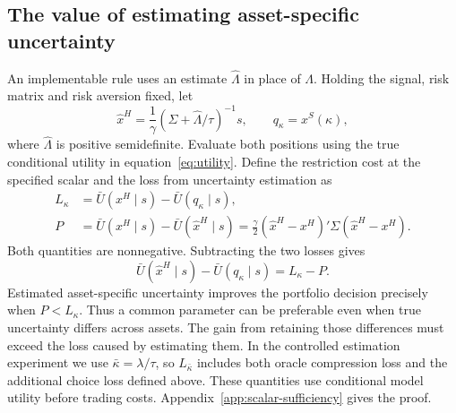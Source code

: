 \subsection{The value of estimating asset-specific uncertainty}
An implementable rule uses an estimate $\widehat\Lambda$ in place of $\Lambda$. Holding the signal, risk matrix and risk aversion fixed, let
\begin{equation}
\widehat x^H=\frac{1}{\gamma}(\Sigma+\widehat\Lambda/\tau)^{-1}s,
\qquad q_\kappa=x^S(\kappa),
\end{equation}
where $\widehat\Lambda$ is positive semidefinite. Evaluate both positions using the true conditional utility in equation~\eqref{eq:utility}. Define the restriction cost at the specified scalar and the loss from uncertainty estimation as
\begin{align}
L_\kappa&=\bar U(x^H\mid s)-\bar U(q_\kappa\mid s),\\
P&=\bar U(x^H\mid s)-\bar U(\widehat x^H\mid s)
=\frac{\gamma}{2}(\widehat x^H-x^H)'\Sigma(\widehat x^H-x^H).
\label{eq:estimation-penalty}
\end{align}
Both quantities are nonnegative. Subtracting the two losses gives
\begin{equation}
\bar U(\widehat x^H\mid s)-\bar U(q_\kappa\mid s)=L_\kappa-P.
\label{eq:estimation-tradeoff}
\end{equation}
Estimated asset-specific uncertainty improves the portfolio decision precisely when $P<L_\kappa$. Thus a common parameter can be preferable even when true uncertainty differs across assets. The gain from retaining those differences must exceed the loss caused by estimating them. In the controlled estimation experiment we use $\bar\kappa=\lambda/\tau$, so $L_{\bar\kappa}$ includes both oracle compression loss and the additional choice loss defined above. These quantities use conditional model utility before trading costs. Appendix~\ref{app:scalar-sufficiency} gives the proof.
